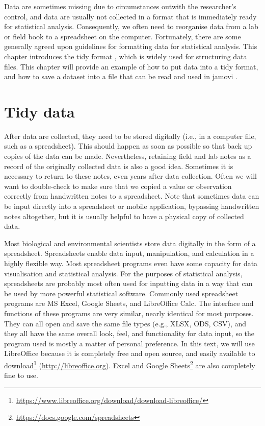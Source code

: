 \documentclass[
  openany]{krantz}
\renewcommand{\href}[2]{#2\footnote{\url{#1}}}
\begin{document}
Data are sometimes missing due to circumstances outwith the researcher's control, and data are usually not collected in a format that is immediately ready for statistical analysis.
Consequently, we often need to reorganise data from a lab or field book to a spreadsheet on the computer.
Fortunately, there are some generally agreed upon guidelines for formatting data for statistical analysis.
This chapter introduces the tidy format \citep{Wickham2014}, which is widely used for structuring data files.
This chapter will provide an example of how to put data into a tidy format, and how to save a dataset into a file that can be read and used in jamovi \citep{Jamovi2022}.

\hypertarget{tidy-data}{%
\section{Tidy data}\label{tidy-data}}

After data are collected, they need to be stored digitally (i.e., in a computer file, such as a spreadsheet).
This should happen as soon as possible so that back up copies of the data can be made.
Nevertheless, retaining field and lab notes as a record of the originally collected data is also a good idea.
Sometimes it is necessary to return to these notes, even years after data collection.
Often we will want to double-check to make sure that we copied a value or observation correctly from handwritten notes to a spreadsheet.
Note that sometimes data can be input directly into a spreadsheet or mobile application, bypassing handwritten notes altogether, but it is usually helpful to have a physical copy of collected data.

Most biological and environmental scientists store data digitally in the form of a spreadsheet.
Spreadsheets enable data input, manipulation, and calculation in a highly flexible way.
Most spreadsheet programs even have some capacity for data visualisation and statistical analysis.
For the purposes of statistical analysis, spreadsheets are probably most often used for inputting data in a way that can be used by more powerful statistical software.
Commonly used spreadsheet programs are MS Excel, Google Sheets, and LibreOffice Calc.
The interface and functions of these programs are very similar, nearly identical for most purposes.
They can all open and save the same file types (e.g., XLSX, ODS, CSV), and they all have the same overall look, feel, and functionality for data input, so the program used is mostly a matter of personal preference.
In this text, we will use LibreOffice because it is completely free and open source, and easily available to \href{https://www.libreoffice.org/download/download-libreoffice/}{download} (\url{http://libreoffice.org}).
Excel and \href{https://docs.google.com/spreadsheets}{Google Sheets} are also completely fine to use.
\end{document}
